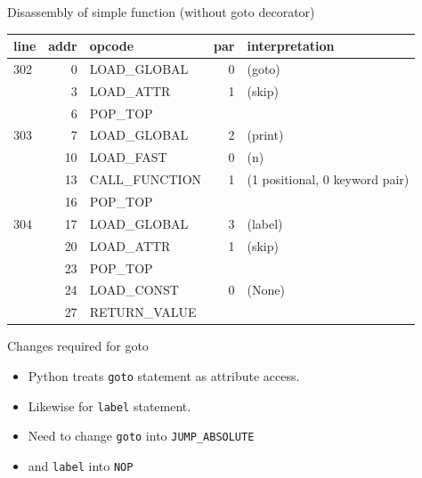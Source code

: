 \documentclass{beamer}
\begin{document}
\begin{frame}[fragile]{Disassembly of simple function (without goto decorator)}
\begin{tabular}{l|r|l|r|l}
line & addr & opcode & par & interpretation \\
\hline
302 &          0 & LOAD\_GLOBAL         &     0 & (goto)  \\
     &           3 &  LOAD\_ATTR               &   1  & (skip)  \\
      &          6 &  POP\_TOP      &  &           \\
\hline
303   &          7 &  LOAD\_GLOBAL         &       2  & (print)  \\
          &     10 &  LOAD\_FAST           &       0 &  (n)  \\
              & 13 &  CALL\_FUNCTION        &      1  & (1 positional, 0 keyword pair)  \\
     &          16 &  POP\_TOP            &     &  \\
\hline
304   &         17 &  LOAD\_GLOBAL        &        3  & (label)  \\
     &          20 &  LOAD\_ATTR          &        1  & (skip)  \\
     &          23 &  POP\_TOP            &     &  \\
\hline     
     &          24 &  LOAD\_CONST         &        0  & (None)  \\
     &          27 &  RETURN\_VALUE      &      &  \\
\end{tabular}
\end{frame}

\begin{frame}[fragile]{Changes required for goto}

\begin{itemize}
\item Python treats \verb!goto! statement as attribute access.
\item Likewise for \verb!label! statement.

\item Need to change \verb!goto! into \verb!JUMP_ABSOLUTE!

\item and \verb!label! into \verb!NOP!
\end{itemize}
\end{frame}
\end{document}
